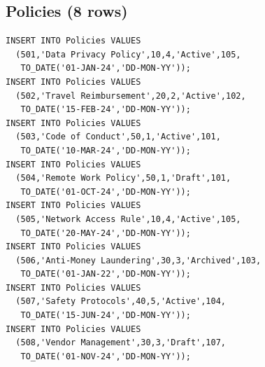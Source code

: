 \documentclass[conference]{IEEEtran}
\begin{document}
\subsection{Policies (8 rows)}
\begin{lstlisting}[style=sqlstyle, caption={DML: INSERT INTO Policies}]
INSERT INTO Policies VALUES
  (501,'Data Privacy Policy',10,4,'Active',105,
   TO_DATE('01-JAN-24','DD-MON-YY'));
INSERT INTO Policies VALUES
  (502,'Travel Reimbursement',20,2,'Active',102,
   TO_DATE('15-FEB-24','DD-MON-YY'));
INSERT INTO Policies VALUES
  (503,'Code of Conduct',50,1,'Active',101,
   TO_DATE('10-MAR-24','DD-MON-YY'));
INSERT INTO Policies VALUES
  (504,'Remote Work Policy',50,1,'Draft',101,
   TO_DATE('01-OCT-24','DD-MON-YY'));
INSERT INTO Policies VALUES
  (505,'Network Access Rule',10,4,'Active',105,
   TO_DATE('20-MAY-24','DD-MON-YY'));
INSERT INTO Policies VALUES
  (506,'Anti-Money Laundering',30,3,'Archived',103,
   TO_DATE('01-JAN-22','DD-MON-YY'));
INSERT INTO Policies VALUES
  (507,'Safety Protocols',40,5,'Active',104,
   TO_DATE('15-JUN-24','DD-MON-YY'));
INSERT INTO Policies VALUES
  (508,'Vendor Management',30,3,'Draft',107,
   TO_DATE('01-NOV-24','DD-MON-YY'));
\end{lstlisting}
\end{document}
